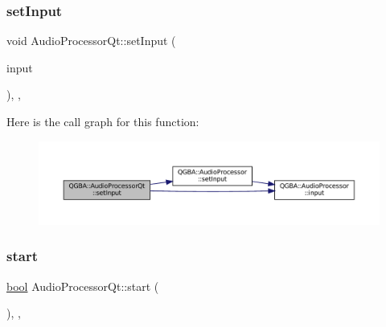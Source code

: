 \mbox{\label{class_q_g_b_a_1_1_audio_processor_qt_acdfbfc0d757eaa87e39dc48ee8006bfd}} 
\subsubsection{\texorpdfstring{set\+Input}{setInput}}
{\footnotesize\ttfamily void Audio\+Processor\+Qt\+::set\+Input (\begin{DoxyParamCaption}\item[{std\+::shared\+\_\+ptr$<$ \mbox{\hyperlink{class_q_g_b_a_1_1_core_controller}{Core\+Controller}} $>$}]{input }\end{DoxyParamCaption})\hspace{0.3cm}{\ttfamily [override]}, {\ttfamily [virtual]}, {\ttfamily [slot]}}

Here is the call graph for this function\+:
\nopagebreak
\begin{figure}[H]
\begin{center}
\leavevmode
\includegraphics[width=350pt]{class_q_g_b_a_1_1_audio_processor_qt_acdfbfc0d757eaa87e39dc48ee8006bfd_cgraph}
\end{center}
\end{figure}
\mbox{\label{class_q_g_b_a_1_1_audio_processor_qt_ad6e05f0d076d2f7dce9f33074d0c7702}} 
\subsubsection{\texorpdfstring{start}{start}}
{\footnotesize\ttfamily \mbox{\hyperlink{libretro_8h_a4a26dcae73fb7e1528214a068aca317e}{bool}} Audio\+Processor\+Qt\+::start (\begin{DoxyParamCaption}{ }\end{DoxyParamCaption})\hspace{0.3cm}{\ttfamily [override]}, {\ttfamily [virtual]}, {\ttfamily [slot]}}

